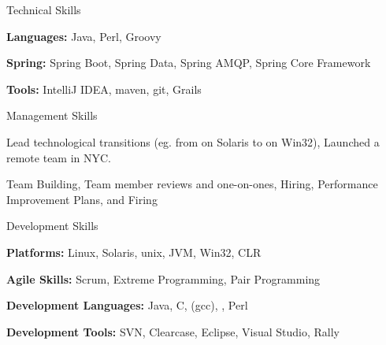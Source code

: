 \begin{cventries}
  \cventry
    {Technical Skills} %
    {} %
    {} %
    {} %
    { \vspace{-0.5mm}
      \begin{cvitems} %
        \item {\textbf{Languages:} Java, Perl, Groovy}
        \item {\textbf{Spring:} Spring Boot, Spring Data, Spring AMQP, Spring Core Framework}
        \item {\textbf{Tools:} IntelliJ IDEA, maven, git, Grails}
      \end{cvitems}
    }

\end{cventries}




\begin{cventries}
  \cventry
    {Management Skills} %
    {} %
    {} %
    {} %
    {\vspace{-0.5mm}
    \begin{cvitems} %
      \item {Lead technological transitions (eg. from \CC{} on Solaris to \CS{} on Win32), Launched a remote team in NYC.}
      \item {Team Building, Team member reviews and one-on-ones, Hiring, Performance Improvement Plans, and Firing}
    \end{cvitems}
    }

  \cventry
    {Development Skills} %
    {} %
    {} %
    {} %
    {\vspace{-0.5mm}
    \begin{cvitems}
      \item {\textbf{Platforms:} Linux, Solaris, unix, JVM, Win32, CLR}
      \item {\textbf{Agile Skills:} Scrum, Extreme Programming, Pair Programming}
      \item {\textbf{Development Languages:} Java, C, \CC{} (gcc), \CS{}, Perl}
      \item {\textbf{Development Tools:} SVN, Clearcase, Eclipse, Visual Studio, Rally}
    \end{cvitems}  
    }
\end{cventries}


